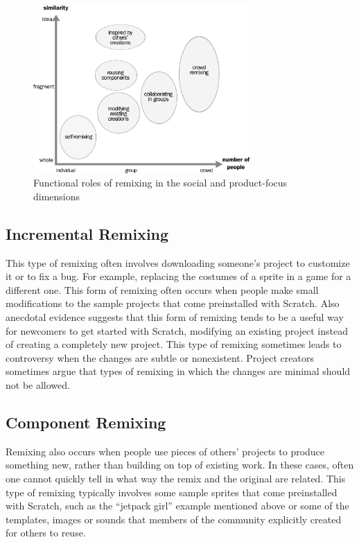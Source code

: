 \begin{figure}
\centering
\includegraphics[width=3.25in]{figures/function.pdf}
\caption{Functional roles of remixing in the social and product-focus dimensions}
\label{fig:function}
\end{figure}

\subsection{Incremental Remixing}
This type of remixing often involves downloading someone's project to customize it or to fix a bug. 
For example, replacing the costumes of a sprite in a game for a different one. 
This form of remixing often occurs when people make small modifications to the sample projects that come preinstalled with Scratch.
Also anecdotal evidence suggests that this form of remixing tends to be a useful way for newcomers to get started with Scratch,  modifying an existing project instead of creating a completely new project.
This type of remixing sometimes leads to controversy when the changes are subtle or nonexistent.
Project creators sometimes argue that types of remixing in which the changes are minimal should not be allowed.

\subsection{Component Remixing}
Remixing also occurs when people use pieces of others' projects to produce something new, rather than building on top of existing work.   
In these cases, often one cannot quickly tell in what way the remix and the original are related.
This type of remixing typically involves some sample sprites that come preinstalled with Scratch, such as the ``jetpack girl'' example mentioned above or some of the templates, images or sounds that members of the community explicitly created for others to reuse.


